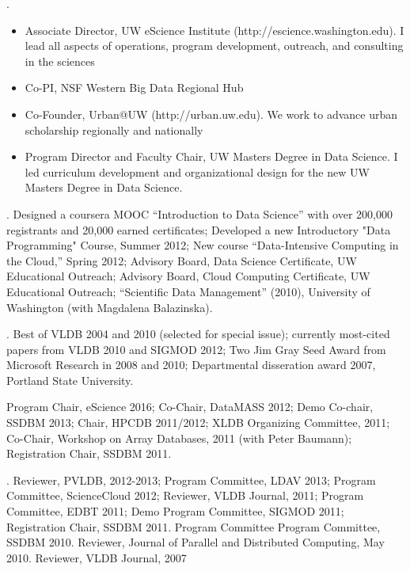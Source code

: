 \documentclass[10pt]{article}
\begin{document}
\begin{cv}{}
. 
\begin{itemize}
\item Associate Director, UW eScience Institute (http://escience.washington.edu). I lead all aspects of operations, program development, outreach, and consulting in the sciences 
\item Co-PI, NSF Western Big Data Regional Hub 
\item Co-Founder, Urban@UW (http://urban.uw.edu). We work to advance urban scholarship regionally and nationally
\item Program Director and Faculty Chair, UW Masters Degree in Data Science.  I led curriculum development and organizational design for the new UW Masters Degree in Data Science.
\end{itemize}

\vspace{0.5em}
. Designed a coursera MOOC ``Introduction to Data Science'' with over 200,000 registrants and 20,000 earned certificates; Developed a new Introductory "Data Programming" Course, Summer 2012; New course ``Data-Intensive Computing in the Cloud,'' Spring 2012; Advisory Board, Data Science Certificate, UW Educational Outreach; Advisory Board, Cloud Computing Certificate, UW Educational Outreach; ``Scientific Data Management'' (2010), University of Washington (with Magdalena Balazinska).

\vspace{0.5em}
.  Best of VLDB 2004 and 2010 (selected for special issue); currently most-cited papers from VLDB 2010 and SIGMOD 2012; Two Jim Gray Seed Award from Microsoft Research in 2008 and 2010; Departmental disseration award 2007, Portland State University.

\vspace{0.5em}
 Program Chair, eScience 2016; Co-Chair, DataMASS 2012; Demo Co-chair, SSDBM 2013; Chair, HPCDB 2011/2012; XLDB Organizing Committee, 2011; Co-Chair, Workshop on Array Databases, 2011 (with Peter Baumann); Registration Chair, SSDBM 2011.

\vspace{0.5em}
. Reviewer, PVLDB, 2012-2013; Program Committee, LDAV 2013; Program Committee, ScienceCloud 2012; Reviewer, VLDB Journal, 2011; Program Committee, EDBT 2011; Demo Program Committee, SIGMOD 2011; Registration Chair, SSDBM 2011. Program Committee Program Committee, SSDBM 2010. Reviewer, Journal of Parallel and Distributed Computing, May 2010.  Reviewer, VLDB Journal, 2007

\end{cv}
\end{document}
